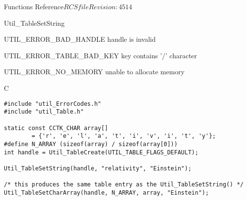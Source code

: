 \begin{cactuspart}{ Functions Reference}{$RCSfile$}{$Revision: 4514 $}
\begin{FunctionDescription}{Util\_TableSetString}
\begin{ErrorSection}
\begin{Error}{UTIL\_ERROR\_BAD\_HANDLE}
handle is invalid
\end{Error}
\begin{Error}{UTIL\_ERROR\_TABLE\_BAD\_KEY}
key contains '/' character
\end{Error}
\begin{Error}{UTIL\_ERROR\_NO\_MEMORY}
unable to allocate memory
\end{Error}
\end{ErrorSection}

\begin{ExampleSection}
\begin{Example}{C}
\begin{verbatim}
#include "util_ErrorCodes.h"
#include "util_Table.h"

static const CCTK_CHAR array[]
        = {'r', 'e', 'l', 'a', 't', 'i', 'v', 'i', 't', 'y'};
#define N_ARRAY (sizeof(array) / sizeof(array[0]))
int handle = Util_TableCreate(UTIL_TABLE_FLAGS_DEFAULT);

Util_TableSetString(handle, "relativity", "Einstein");

/* this produces the same table entry as the Util_TableSetString() */
Util_TableSetCharArray(handle, N_ARRAY, array, "Einstein");
\end{verbatim}
\end{Example}
\end{ExampleSection}
\end{FunctionDescription}


\end{cactuspart}
